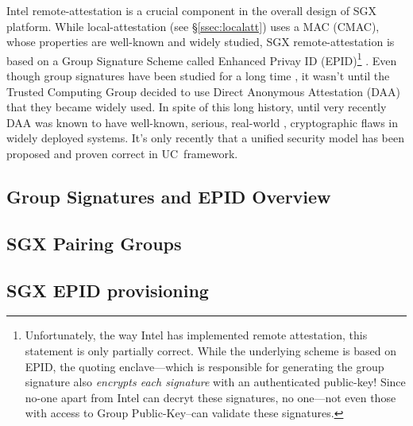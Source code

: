\documentclass[10pt]{article}
\newcommand{\secref}[1]{\S\ref{#1}}
\newcommand{\uc}{\textsf{UC}}
\begin{document}
  Intel remote-attestation is a crucial component in the overall
  design of SGX platform. While local-attestation (see
  \secref{ssec:localatt}) uses a MAC (CMAC), whose properties are
  well-known and widely studied, SGX remote-attestation is based on a
  Group Signature Scheme \cite{ChaumGroupSignatures} called Enhanced
  Privay ID (EPID)\footnote{Unfortunately, the way Intel has
    implemented remote attestation, this statement is only partially
    correct. While the underlying scheme is based on EPID, the quoting
    enclave---which is responsible for generating the group signature
    also \textit{encrypts each signature} with an authenticated
    public-key! Since no-one apart from Intel can decryt these
    signatures, no one---not even those with access to Group
    Public-Key--can validate these signatures.} \cite{epid}. Even
  though group signatures have been studied for a long time
  \cite{camenischLysyankaya, coalitionresistant, BMW03,
    dynamicGroupSignatures}, it wasn't until the Trusted Computing
  Group decided to use Direct Anonymous Attestation (DAA) \cite{daa}
  that they became widely used. In spite of this long history, until
  very recently DAA was known to have well-known, serious, real-world
  \cite{tpmDHOracle}, cryptographic flaws \cite{daaproblems} in widely
  deployed systems. It's only recently that a unified security model
  has been proposed \cite{ucdaa} and proven correct in \uc\ framework.

  \subsection{Group Signatures and EPID Overview}
  \label{ssec:epid}
  \cite{bbs}
  \cite{bbsplus}
  \cite{concurrentJoinGroupSignatures}

  \subsection{SGX Pairing Groups}
  \label{ssec:pairings}

  \subsection{SGX EPID provisioning}
  \label{ssec:epidprov}
\end{document}
